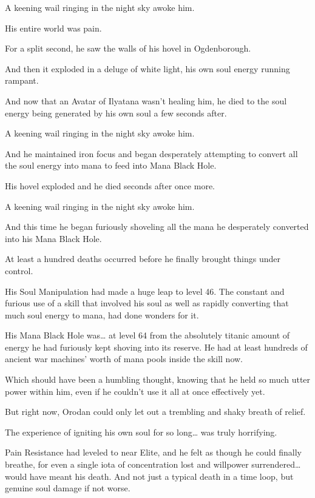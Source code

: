 \documentclass[a4paper,10pt]{book}
\begin{document}
\par
A keening wail ringing in the night sky awoke him.\par
His entire world was pain.\par
For a split second, he saw the walls of his hovel in Ogdenborough.\par
And then it exploded in a deluge of white light, his own soul energy running rampant.\par
And now that an Avatar of Ilyatana wasn’t healing him, he died to the soul energy being generated by his own soul a few seconds after.\par
A keening wail ringing in the night sky awoke him.\par
And he maintained iron focus and began desperately attempting to convert all the soul energy into mana to feed into Mana Black Hole.\par
His hovel exploded and he died seconds after once more.\par
A keening wail ringing in the night sky awoke him.\par
And this time he began furiously shoveling all the mana he desperately converted into his Mana Black Hole.\par
At least a hundred deaths occurred before he finally brought things under control.\par
His Soul Manipulation had made a huge leap to level 46. The constant and furious use of a skill that involved his soul as well as rapidly converting that much soul energy to mana, had done wonders for it.\par
His Mana Black Hole was… at level 64 from the absolutely titanic amount of energy he had furiously kept shoving into its reserve. He had at least hundreds of ancient war machines’ worth of mana pools inside the skill now.\par
Which should have been a humbling thought, knowing that he held so much utter power within him, even if he couldn’t use it all at once effectively yet.\par
But right now, Orodan could only let out a trembling and shaky breath of relief.\par
The experience of igniting his own soul for so long… was truly horrifying.\par
Pain Resistance had leveled to near Elite, and he felt as though he could finally breathe, for even a single iota of concentration lost and willpower surrendered… would have meant his death. And not just a typical death in a time loop, but genuine soul damage if not worse.\par
\end{document}
